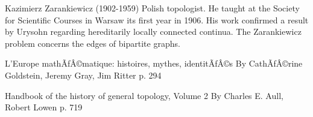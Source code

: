 \documentclass[12pt]{article}
\begin{document}
Kazimierz Zarankiewicz (1902-1959) Polish topologist. He taught at the Society for Scientific Courses in Warsaw its first year in 1906. His work confirmed a result by Urysohn regarding hereditarily locally connected continua. The Zarankiewicz problem concerns the edges of bipartite graphs.

L'Europe mathÃƒÂ©matique: histoires, mythes, identitÃƒÂ©s
 By CathÃƒÂ©rine Goldstein, Jeremy Gray, Jim Ritter
  p. 294

Handbook of the history of general topology, Volume 2
 By Charles E. Aull, Robert Lowen
  p. 719
\end{document}
